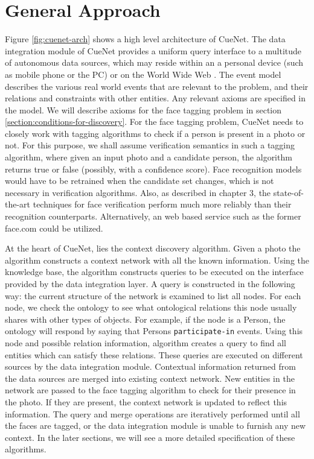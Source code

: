 \section{General Approach}
Figure \ref{fig:cuenet-arch} shows a high level architecture of CueNet. The data integration module of CueNet provides a uniform query interface to a multitude of autonomous data sources, which may reside within an a personal device (such as mobile phone or the PC) or on the World Wide Web \cite{halevy2001answering}. The event model describes the various real world events that are relevant to the problem, and their relations and constraints with other entities. Any relevant axioms are specified in the model. We will describe axioms for the face tagging problem in section \ref{section:conditions-for-discovery}. For the face tagging problem, CueNet needs to closely work with tagging algorithms to check if a person is present in a photo or not. For this purpose, we shall assume verification semantics in such a tagging algorithm, where given an input photo and a candidate person, the algorithm returns true or false (possibly, with a confidence score). Face recognition models would have to be retrained when the candidate set changes, which is not necessary in verification algorithms. Also, as described in chapter 3, the state-of-the-art techniques for face verification perform much more reliably than their recognition counterparts. Alternatively, an web based service such as the former face.com could be utilized. 

At the heart of CueNet, lies the context discovery algorithm. Given a photo the algorithm constructs a context network with all the known information. Using the knowledge base, the algorithm constructs queries to be executed on the interface provided by the data integration layer. A query is constructed in the following way: the current structure of the network is examined to list all nodes. For each node, we check the ontology to see what ontological relations this node usually shares with other types of objects. For example, if the node is a Person, the ontology will respond by saying that Persons \texttt{participate-in} events. Using this node and possible relation information, algorithm creates a query to find all entities which can satisfy these relations. These queries are executed on different sources by the data integration module. Contextual information returned from the data sources are merged into existing context network. New entities in the network are passed to the face tagging algorithm to check for their presence in the photo. If they are present, the context network is updated to reflect this information. The query and merge operations are iteratively performed until all the faces are tagged, or the data integration module is unable to furnish any new context. In the later sections, we will see a more detailed specification of these algorithms.

